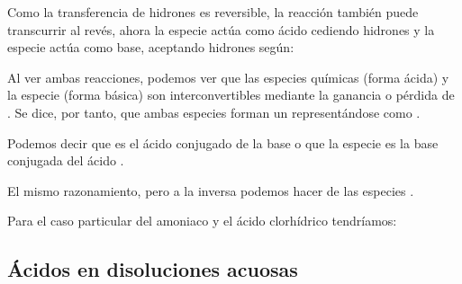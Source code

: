 Como la transferencia de hidrones es reversible, la reacción también puede transcurrir al revés, ahora la especie  actúa como ácido cediendo hidrones y la especie  actúa como base, aceptando hidrones según:
\begin{centeredequation}
\end{centeredequation}


Al ver ambas reacciones, podemos ver que las especies químicas  (forma ácida) y la especie  (forma básica) son interconvertibles mediante la ganancia o pérdida de .
Se dice, por tanto, que ambas especies forman un  representándose como .

Podemos decir que  es el ácido conjugado de la base  o que la especie  es la base conjugada del ácido .

El mismo razonamiento, pero a la inversa podemos hacer de las especies .

\vspace{10mm}
\begin{minipage}{\textwidth}
    \centering
     \ch{+}  \ch{<=>}  \ch{+} 
\end{minipage}
\vspace{10mm}

Para el caso particular del amoniaco y el ácido clorhídrico tendríamos:

\vspace{10mm}
\begin{minipage}{0.8\textwidth}
    \centering
     \ch{+}  \ch{<=>}  \ch{+} 
\end{minipage}

\subsection{Ácidos en disoluciones acuosas}\label{subsec:acidos-en-disoluciones-acuosas}

